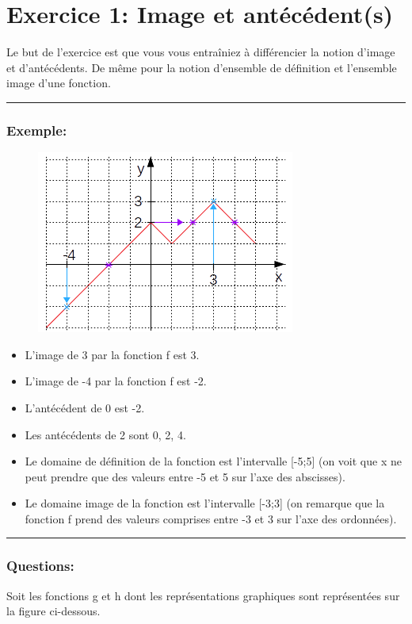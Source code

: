 \documentclass[11pt, french]{article}
\begin{document}
\section*{Exercice 1: Image et antécédent(s)}
Le but de l'exercice est que vous vous entraîniez à différencier la notion d'image et d'antécédents.
De même pour la notion d'ensemble de définition et l'ensemble image d'une fonction.\

\noindent\rule{\textwidth}{1pt}
\subsubsection*{Exemple:}

\begin{figure}[!h]
\center
\includegraphics[scale=0.9]{assets/serie_1_exo_1_figure_1.png}
\label{fig:p_s_1_exo1-fig1}
\end{figure}

\begin{itemize}
    \item L'image de 3 par la fonction f est 3.
    \item L'image de -4 par la fonction f est -2.
    \item L'antécédent de 0 est -2.
    \item Les antécédents de 2 sont 0, 2, 4.
    \item Le domaine de définition de la fonction est l'intervalle [-5;5] (on voit que x ne peut prendre que des valeurs entre -5 et 5 sur l'axe des abscisses).
    \item Le domaine image de la fonction est l'intervalle [-3;3] (on remarque que la fonction f prend des valeurs comprises entre -3 et 3 sur l'axe des ordonnées).
\end{itemize}
\noindent\rule{\textwidth}{1pt}

\subsubsection*{Questions:}
Soit les fonctions g et h dont les représentations graphiques sont représentées sur la figure ci-dessous.
\end{document}
